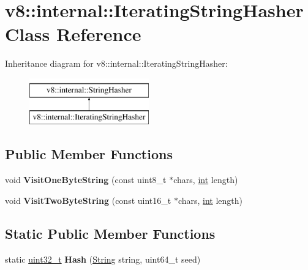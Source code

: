 \hypertarget{classv8_1_1internal_1_1IteratingStringHasher}{}\section{v8\+:\+:internal\+:\+:Iterating\+String\+Hasher Class Reference}
\label{classv8_1_1internal_1_1IteratingStringHasher}
Inheritance diagram for v8\+:\+:internal\+:\+:Iterating\+String\+Hasher\+:\begin{figure}[H]
\begin{center}
\leavevmode
\includegraphics[height=2.000000cm]{classv8_1_1internal_1_1IteratingStringHasher}
\end{center}
\end{figure}
\subsection*{Public Member Functions}
\begin{DoxyCompactItemize}
\item 
\mbox{\label{classv8_1_1internal_1_1IteratingStringHasher_a7be677eeced4b534a8f4b19a68fae449}} 
void {\bfseries Visit\+One\+Byte\+String} (const uint8\+\_\+t $\ast$chars, \mbox{\hyperlink{classint}{int}} length)
\item 
\mbox{\label{classv8_1_1internal_1_1IteratingStringHasher_a77569d7793ecc1e6c6b5a7286f96857d}} 
void {\bfseries Visit\+Two\+Byte\+String} (const uint16\+\_\+t $\ast$chars, \mbox{\hyperlink{classint}{int}} length)
\end{DoxyCompactItemize}
\subsection*{Static Public Member Functions}
\begin{DoxyCompactItemize}
\item 
\mbox{\label{classv8_1_1internal_1_1IteratingStringHasher_abcfbc160df7d7d0a48e9aba809bf914e}} 
static \mbox{\hyperlink{classuint32__t}{uint32\+\_\+t}} {\bfseries Hash} (\mbox{\hyperlink{classv8_1_1internal_1_1String}{String}} string, uint64\+\_\+t seed)
\end{DoxyCompactItemize}
